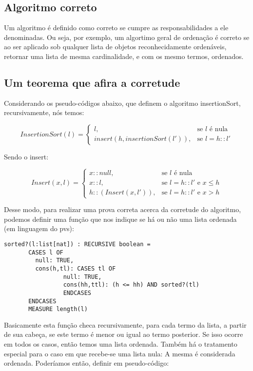 \documentclass[a4paper, 10pt]{article}
\begin{document}
\subsection{Algoritmo correto}

Um algoritmo é definido como correto se cumpre as responsabilidades a ele denominadas. Ou seja, por exemplo, um algortimo geral de ordenação é correto se ao ser aplicado sob qualquer lista de objetos reconhecidamente ordenáveis, retornar uma lista de mesma cardinalidade, e com os mesmo termos, ordenados. 

\subsection{Um teorema que afira a corretude}

Considerando os pseudo-códigos abaixo, que definem o algoritmo insertionSort, recursivamente, nós temos:
 
$$
InsertionSort(l) = \begin{cases}
l,  &\mbox{se } l\mbox{ é nula}\\
insert(h,insertionSort(l')), &\mbox{se } l = h::l'
\end{cases}
$$

Sendo o insert: 

$$
Insert(x, l) = \begin{cases}
x::null,  &\mbox{se } l\mbox{ é nula}\\
x::l, &\mbox{se } l = h::l' \mbox{  e  } x \leq h \\
h::(Insert(x,l')), &\mbox{se } l = h::l' \mbox{  e  }  x > h
\end{cases}
$$

Desse modo, para realizar uma prova correta acerca da corretude do algoritmo, podemos definir uma função que nos indique se há ou não uma lista ordenada (em linguagem do pvs): 

\begin{lstlisting}[tabsize = 4]
    sorted?(l:list[nat]) : RECURSIVE boolean =
	   CASES l OF
	   	 null: TRUE,
		 cons(h,tl): CASES tl OF
		 	     null: TRUE,
			     cons(hh,ttl): (h <= hh) AND sorted?(tl)
			     ENDCASES
	   ENDCASES
	   MEASURE length(l)
\end{lstlisting}

Basicamente esta função checa recursivamente, para cada termo da lista, a partir de sua cabeça, se este termo é menor ou igual ao termo posterior. Se isso ocorre em todos os casos, então temos uma lista ordenada. Também há o tratamento especial para o caso em que recebe-se uma lista nula: A mesma é considerada ordenada. Poderíamos então, definir em pseudo-código:
\end{document}
